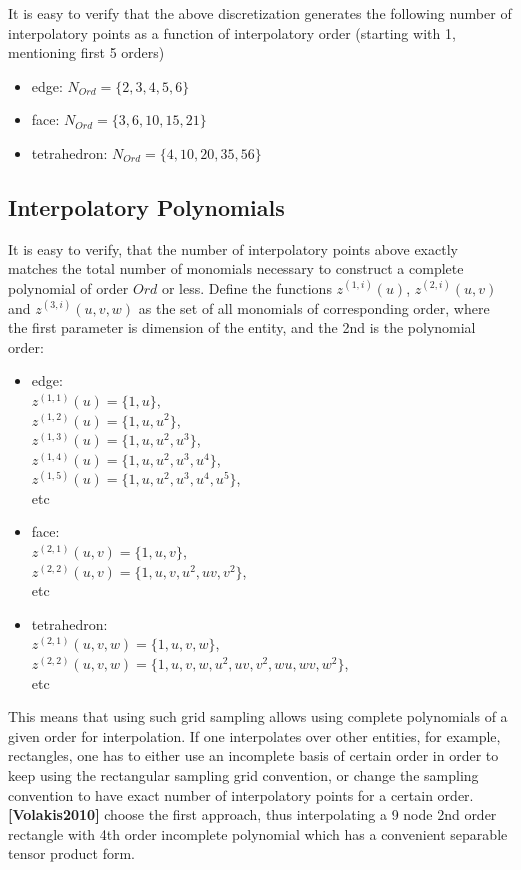\noindent
It is easy to verify that the above discretization generates the following number of interpolatory points as a function of interpolatory order (starting with 1, mentioning first 5 orders)
\begin{itemize}
	\item edge:			$N_{Ord} = \{ 2,3,4,5,6 \}  $
	\item face:			$N_{Ord} = \{ 3,6,10,15,21 \}  $
	\item tetrahedron:	$N_{Ord} = \{ 4,10,20,35,56 \}  $
\end{itemize}

\subsection{Interpolatory Polynomials}
\label{theory-lagrange-polynomials}

\noindent
It is easy to verify, that the number of interpolatory points above exactly matches the total number of monomials necessary to construct a complete polynomial of order $Ord$ or less. Define the functions $z^{(1,i)}(u)$, $z^{(2,i)}(u,v)$ and $z^{(3,i)}(u,v,w)$ as the set of all monomials of corresponding order, where the first parameter is dimension of the entity, and the 2nd is the polynomial order:
\begin{itemize}
	\item edge: \\
		$z^{(1,1)}(u) = \{1, u\}$, \\
		$z^{(1,2)}(u) = \{1, u, u^2\}$, \\
		$z^{(1,3)}(u) = \{1, u, u^2, u^3\}$, \\
		$z^{(1,4)}(u) = \{1, u, u^2, u^3, u^4\}$, \\
		$z^{(1,5)}(u) = \{1, u, u^2, u^3, u^4, u^5\}$, \\
		etc
	\item face:	\\
		$z^{(2,1)}(u,v)	= \{1, u, v\}$, \\
		$z^{(2,2)}(u,v) = \{1, u, v, u^2, uv, v^2\}$, \\
		etc
	\item tetrahedron: \\
		$z^{(2,1)}(u,v,w) = \{1, u, v, w\}$, \\ 
		$z^{(2,2)}(u,v,w) = \{1, u, v, w, u^2, uv, v^2, wu, wv, w^2\}$, \\
		etc
\end{itemize}

\noindent
This means that using such grid sampling allows using complete polynomials of a given order for interpolation. If one interpolates over other entities, for example, rectangles, one has to either use an incomplete basis of certain order in order to keep using the rectangular sampling grid convention, or change the sampling convention to have exact number of interpolatory points for a certain order. \textbf{[Volakis2010]} choose the first approach, thus interpolating a 9 node 2nd order rectangle with 4th order incomplete polynomial which has a convenient separable tensor product form. \\

